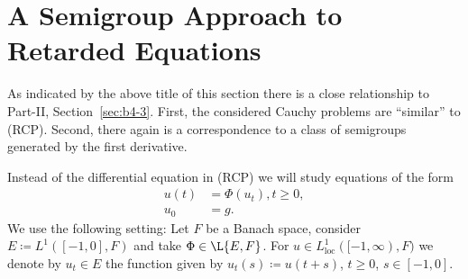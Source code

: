 \newpage
\section{A Semigroup Approach to Retarded Equations}\label{sec:c4-3}
%
%
%
\hspace{1cm}{\Large by Annette Grabosch und Ulrich Moustakas}
\vspace{.5cm}
\newline
{}
As indicated by the above title of this section there is a close relationship to Part-II, Section~\ref{sec:b4-3}.
First, the considered Cauchy problems are \enquote{similar} to (RCP).
Second, there again is a correspondence to a class of semigroups generated by the first derivative.

Instead of the differential equation in (RCP) we will study equations of the form
\begin{equation*}\label{eq:c4-re} \tag{RE}
\begin{split} 
u(t) &= \Phi(u_t),  t \geq 0,\\
u_0 &= g.
\end{split}
\end{equation*}
We use the following setting: Let $F$ be a Banach space, consider $E \coloneqq L^{1}([-1,0],F)$ and take $\Phi \in \L{E,F}$.
For $u \in L^{1}_{\mathrm{loc}}([-1,\infty),F)$ we denote by $u_t \in E$ the function given by $u_t(s) \coloneqq u(t+s)$, $t \geq 0$, $s \in [-1,0]$.

